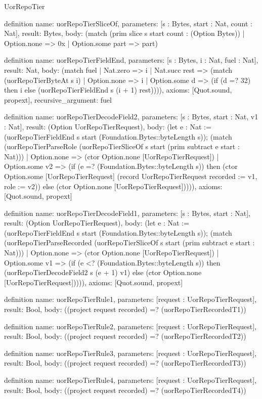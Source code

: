 \begin{lexlean}{UorRepoTier}
\begin{semanticmodule}
definition{
  name: uorRepoTierSliceOf,
  parameters: [s : Bytes, start : Nat, count : Nat],
  result: Bytes,
  body: (match (prim slice s start count : (Option Bytes))
    | Option.none => 0x
    | Option.some part => part)
}

definition{
  name: uorRepoTierFieldEnd,
  parameters: [s : Bytes, i : Nat, fuel : Nat],
  result: Nat,
  body: (match fuel
    | Nat.zero => i
    | Nat.succ rest => (match (uorRepoTierByteAt s i)
      | Option.none => i
      | Option.some d => (if (d =? 32) then i else (uorRepoTierFieldEnd s (i + 1) rest)))),
  axioms: [Quot.sound, propext],
  recursive_argument: fuel
}

definition{
  name: uorRepoTierDecodeField2,
  parameters: [s : Bytes, start : Nat, v1 : Nat],
  result: (Option UorRepoTierRequest),
  body: (let e : Nat := (uorRepoTierFieldEnd s start (Foundation.Bytes::byteLength s)); (match (uorRepoTierParseRole (uorRepoTierSliceOf s start (prim subtract e start : Nat)))
    | Option.none => (ctor Option.none [UorRepoTierRequest])
    | Option.some v2 => (if (e =? (Foundation.Bytes::byteLength s)) then (ctor Option.some [UorRepoTierRequest] (record UorRepoTierRequest {recorded := v1, role := v2})) else (ctor Option.none [UorRepoTierRequest])))),
  axioms: [Quot.sound, propext]
}

definition{
  name: uorRepoTierDecodeField1,
  parameters: [s : Bytes, start : Nat],
  result: (Option UorRepoTierRequest),
  body: (let e : Nat := (uorRepoTierFieldEnd s start (Foundation.Bytes::byteLength s)); (match (uorRepoTierParseRecorded (uorRepoTierSliceOf s start (prim subtract e start : Nat)))
    | Option.none => (ctor Option.none [UorRepoTierRequest])
    | Option.some v1 => (if (e <? (Foundation.Bytes::byteLength s)) then (uorRepoTierDecodeField2 s (e + 1) v1) else (ctor Option.none [UorRepoTierRequest])))),
  axioms: [Quot.sound, propext]
}

definition{
  name: uorRepoTierRule1,
  parameters: [request : UorRepoTierRequest],
  result: Bool,
  body: ((project request recorded) =? (uorRepoTierRecordedT1))
}

definition{
  name: uorRepoTierRule2,
  parameters: [request : UorRepoTierRequest],
  result: Bool,
  body: ((project request recorded) =? (uorRepoTierRecordedT2))
}

definition{
  name: uorRepoTierRule3,
  parameters: [request : UorRepoTierRequest],
  result: Bool,
  body: ((project request recorded) =? (uorRepoTierRecordedT3))
}

definition{
  name: uorRepoTierRule4,
  parameters: [request : UorRepoTierRequest],
  result: Bool,
  body: ((project request recorded) =? (uorRepoTierRecordedT4))
}


\end{semanticmodule}
\end{lexlean}
